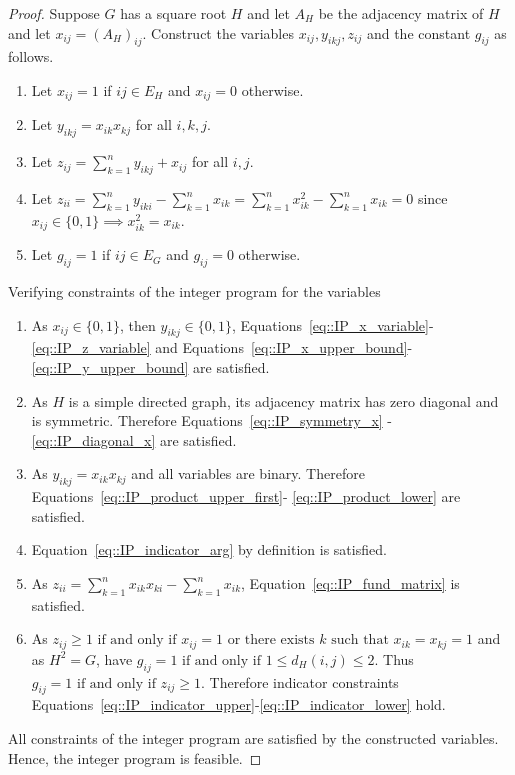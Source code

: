 \documentclass[11pt]{article}
\begin{document}
\begin{proof}
  Suppose $G$ has a square root $H$ and let $A_H$ be the adjacency matrix of $H$ and let  $x_{ij} = (A_H)_{ij}$. Construct the variables $x_{ij}, y_{ikj}, z_{ij}$ and the constant $g_{ij}$ as follows.
  \begin{enumerate}[label=\roman*)]
    \item Let $x_{ij} = 1$ if $ij \in E_H$ and $x_{ij}=0$ otherwise. 
    \item Let $y_{ikj} = x_{ik}x_{kj}$ for all $i,k,j$. 
    \item Let $\displaystyle z_{ij} = \sum_{k = 1}^{n} y_{ikj} + x_{ij} $ for all $i,j$. 
    \item Let $\displaystyle z_{ii} = \sum_{k  = 1}^{n} y_{iki} - \sum_{k = 1}^{n} x_{ik} =  \sum_{k = 1}^{n} x_{ik}^2 -  \sum_{k = 1}^{n} x_{ik} = 0 $
    since $x_{ij} \in \{0 , 1\} \implies x_{ik}^2 = x_{ik}$. 
    \item Let $g_{ij} = 1$ if $ij \in E_G$ and $g_{ij}=0$ otherwise. 
  \end{enumerate}
  Verifying constraints of the integer program for the variables 
  \begin{enumerate}[label=\roman*)]
    \item As $x_{ij} \in \{0, 1 \}$, then $y_{ikj}  \in \{0, 1 \}$, Equations~\eqref{eq::IP_x_variable}-\eqref{eq::IP_z_variable}
    and Equations~\eqref{eq::IP_x_upper_bound}-\eqref{eq::IP_y_upper_bound} are satisfied.  
    \item As $H$ is a simple directed graph, its adjacency matrix has zero diagonal and is symmetric. Therefore Equations~\eqref{eq::IP_symmetry_x}
    -\eqref{eq::IP_diagonal_x} are satisfied.  
    \item As $y_{ikj} = x_{ik}x_{kj}$ and all variables are binary. Therefore Equations~\eqref{eq::IP_product_upper_first}-
    \eqref{eq::IP_product_lower} are satisfied. 
    \item Equation~\eqref{eq::IP_indicator_arg} by definition is satisfied. 
    \item As $\displaystyle z_{ii} = \sum_{k = 1}^{n} x_{ik}x_{ki} - \sum_{k = 1}^{n} x_{ik}$, Equation~\eqref{eq::IP_fund_matrix} is satisfied. 
    \item As $\displaystyle z_{ij} \geq 1 \text{ if and only if } x_{ij} = 1 \text{ or there exists } k \text{ such that } x_{ik}=x_{kj}= 1$ and as $H^2 = G$, have $g_{ij} = 1 \text{ if and only if } 1 \leq d_H(i,j) \leq 2$. Thus $g_{ij} = 1 \text{ if and only if } z_{ij} \geq 1$. Therefore indicator constraints Equations~\eqref{eq::IP_indicator_upper}-\eqref{eq::IP_indicator_lower} hold. 
  \end{enumerate}
  All constraints of the integer program are satisfied by the constructed variables. Hence, the integer program is feasible.


\end{proof}
\end{document}

